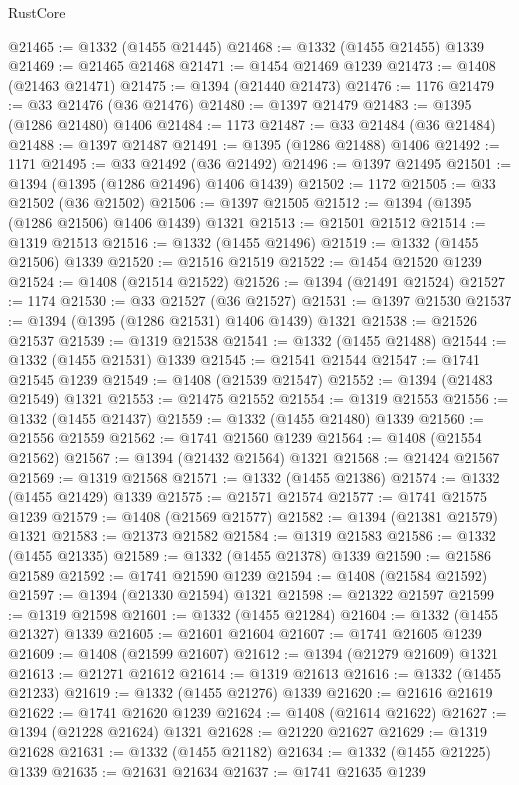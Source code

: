 \begin{lexlean}{RustCore}
\begin{coremodule}
@21465 := @1332 (@1455 @21445)
@21468 := @1332 (@1455 @21455) @1339
@21469 := @21465 @21468
@21471 := @1454 @21469 @1239
@21473 := @1408 (@21463 @21471)
@21475 := @1394 (@21440 @21473)
@21476 := 1176
@21479 := @33 @21476 (@36 @21476)
@21480 := @1397 @21479
@21483 := @1395 (@1286 @21480) @1406
@21484 := 1173
@21487 := @33 @21484 (@36 @21484)
@21488 := @1397 @21487
@21491 := @1395 (@1286 @21488) @1406
@21492 := 1171
@21495 := @33 @21492 (@36 @21492)
@21496 := @1397 @21495
@21501 := @1394 (@1395 (@1286 @21496) @1406 @1439)
@21502 := 1172
@21505 := @33 @21502 (@36 @21502)
@21506 := @1397 @21505
@21512 := @1394 (@1395 (@1286 @21506) @1406 @1439) @1321
@21513 := @21501 @21512
@21514 := @1319 @21513
@21516 := @1332 (@1455 @21496)
@21519 := @1332 (@1455 @21506) @1339
@21520 := @21516 @21519
@21522 := @1454 @21520 @1239
@21524 := @1408 (@21514 @21522)
@21526 := @1394 (@21491 @21524)
@21527 := 1174
@21530 := @33 @21527 (@36 @21527)
@21531 := @1397 @21530
@21537 := @1394 (@1395 (@1286 @21531) @1406 @1439) @1321
@21538 := @21526 @21537
@21539 := @1319 @21538
@21541 := @1332 (@1455 @21488)
@21544 := @1332 (@1455 @21531) @1339
@21545 := @21541 @21544
@21547 := @1741 @21545 @1239
@21549 := @1408 (@21539 @21547)
@21552 := @1394 (@21483 @21549) @1321
@21553 := @21475 @21552
@21554 := @1319 @21553
@21556 := @1332 (@1455 @21437)
@21559 := @1332 (@1455 @21480) @1339
@21560 := @21556 @21559
@21562 := @1741 @21560 @1239
@21564 := @1408 (@21554 @21562)
@21567 := @1394 (@21432 @21564) @1321
@21568 := @21424 @21567
@21569 := @1319 @21568
@21571 := @1332 (@1455 @21386)
@21574 := @1332 (@1455 @21429) @1339
@21575 := @21571 @21574
@21577 := @1741 @21575 @1239
@21579 := @1408 (@21569 @21577)
@21582 := @1394 (@21381 @21579) @1321
@21583 := @21373 @21582
@21584 := @1319 @21583
@21586 := @1332 (@1455 @21335)
@21589 := @1332 (@1455 @21378) @1339
@21590 := @21586 @21589
@21592 := @1741 @21590 @1239
@21594 := @1408 (@21584 @21592)
@21597 := @1394 (@21330 @21594) @1321
@21598 := @21322 @21597
@21599 := @1319 @21598
@21601 := @1332 (@1455 @21284)
@21604 := @1332 (@1455 @21327) @1339
@21605 := @21601 @21604
@21607 := @1741 @21605 @1239
@21609 := @1408 (@21599 @21607)
@21612 := @1394 (@21279 @21609) @1321
@21613 := @21271 @21612
@21614 := @1319 @21613
@21616 := @1332 (@1455 @21233)
@21619 := @1332 (@1455 @21276) @1339
@21620 := @21616 @21619
@21622 := @1741 @21620 @1239
@21624 := @1408 (@21614 @21622)
@21627 := @1394 (@21228 @21624) @1321
@21628 := @21220 @21627
@21629 := @1319 @21628
@21631 := @1332 (@1455 @21182)
@21634 := @1332 (@1455 @21225) @1339
@21635 := @21631 @21634
@21637 := @1741 @21635 @1239

\end{coremodule}
\end{lexlean}
